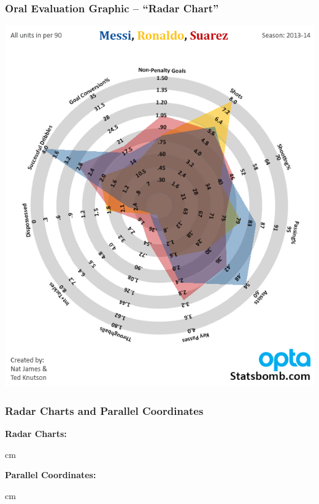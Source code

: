 \documentclass{beamer} %
\begin{document}
\begin{frame}\frametitle{Oral Evaluation Graphic -- ``Radar Chart''}
	\small
	\centering
	\includegraphics[width = 0.66\linewidth]{radar.png}
	
\end{frame}



\begin{frame}\frametitle{Radar Charts and Parallel Coordinates}
	\small
	\textbf{Radar Charts:}
	
	 cm
	
	\textbf{Parallel Coordinates:}
	
	 cm
	
\end{frame}
\end{document}
